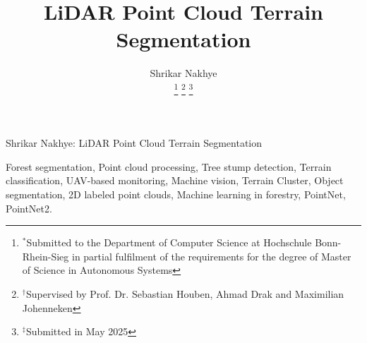 \documentclass[lettersize,journal]{IEEEtran}
\begin{document}
\title{LiDAR Point Cloud Terrain Segmentation}

\author{Shrikar Nakhye

        
\thanks{$^*$Submitted to the Department of Computer Science at Hochschule Bonn-Rhein-Sieg in partial fulfilment of the requirements for the degree of Master of Science in Autonomous Systems}
\thanks{$^{\dagger}$Supervised by Prof. Dr. Sebastian Houben, Ahmad Drak and Maximilian Johenneken}
\thanks{$^{\ddagger}$Submitted in May 2025}} %

%
{Shrikar Nakhye: LiDAR Point Cloud Terrain Segmentation}

\maketitle


\begin{IEEEkeywords}
Forest segmentation, Point cloud processing, Tree stump detection, Terrain classification, UAV-based monitoring, Machine vision, Terrain Cluster, Object segmentation, 2D labeled point clouds, Machine learning in forestry, PointNet, PointNet2.
\end{IEEEkeywords}












\end{document}
